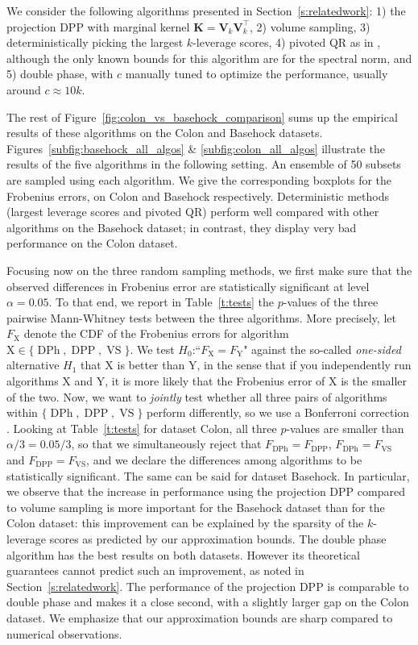 \documentclass[twoside,11pt]{book}
\numberwithin{theorem}{chapter}
\numberwithin{definition}{chapter}
\numberwithin{proposition}{chapter}
\numberwithin{corollary}{chapter}
\numberwithin{example}{chapter}
\numberwithin{lemma}{chapter}
\numberwithin{assumption}{chapter}
\numberwithin{equation}{chapter}
\numberwithin{figure}{chapter}
\DeclareMathOperator{\DPP}{\mathrm{DPP}}
\DeclareMathOperator{\VS}{\mathrm{VS}}
\DeclareMathOperator{\Tran}{\intercal}
\DeclareMathOperator{\DPh}{\mathrm{DPh}}
\begin{document}
We consider the following algorithms presented in Section~\ref{s:relatedwork}: 1) the projection DPP with marginal kernel $\bm{K}=\bm{V}_{k}^{}\bm{V}_{k}^{\Tran}$, 2) volume sampling, 3) deterministically picking the largest $k$-leverage scores, 4) pivoted QR as in \cite{Golu65}, although the only known bounds for this algorithm are for the spectral norm, and 5) double phase, with $c$ manually tuned to optimize the performance, usually around $c \approx 10k$.

The rest of Figure~\ref{fig:colon_vs_basehock_comparison} sums up the empirical results of these algorithms on the Colon and Basehock datasets.
%
Figures~\ref{subfig:basehock_all_algos} \& \ref{subfig:colon_all_algos} illustrate the results of the five algorithms in the following setting. An ensemble of 50 subsets are sampled using each algorithm. We give the corresponding boxplots for the Frobenius errors, on Colon and Basehock respectively.
%
Deterministic methods (largest leverage scores and pivoted QR) perform well compared with other algorithms on the Basehock dataset; in contrast, they display very bad performance on the Colon dataset.

Focusing now on the three random sampling methods, we first make sure that the observed differences in Frobenius error are statistically significant at level $\alpha=0.05$. To that end, we report in Table~\ref{t:tests} the $p$-values of the three pairwise Mann-Whitney tests between the three algorithms. More precisely, let $F_\text{X}$ denote the CDF of the Frobenius errors for algorithm $\text{X}\in\{\DPh,\DPP,\VS\}$. We test $H_0$:``$F_\text{X}=F_\text{Y}$" against the so-called \emph{one-sided} alternative $H_1$ that X is better than Y, in the sense that if you independently run algorithms X and Y, it is more likely that the Frobenius error of X is the smaller of the two. Now, we want to \emph{jointly} test whether all three pairs of algorithms within $\{\DPh,\DPP,\VS\}$ perform differently, so we use a Bonferroni correction \parencite{Was13}. Looking at Table~\ref{t:tests} for dataset Colon, all three $p$-values are smaller than $\alpha/3=0.05/3$, so that we simultaneously reject that $F_{\DPh}=F_{\DPP}$, $F_{\DPh}=F_{\VS}$ and $F_{\DPP}=F_{\VS}$, and we declare the differences among algorithms to be statistically significant. The same can be said for dataset Basehock. In particular, we observe that the increase in performance using the projection DPP compared to volume sampling is more important for the Basehock dataset than for the Colon dataset: this improvement can be explained by the sparsity of the $k$-leverage scores as predicted by our approximation bounds.
%
The double phase algorithm has the best results on both datasets. However its theoretical guarantees cannot predict such an improvement, as noted in Section~\ref{s:relatedwork}. The performance of the projection DPP is comparable to double phase and makes it a close second, with a slightly larger gap on the Colon dataset. We emphasize that our approximation bounds are sharp compared to numerical observations.
\end{document}
